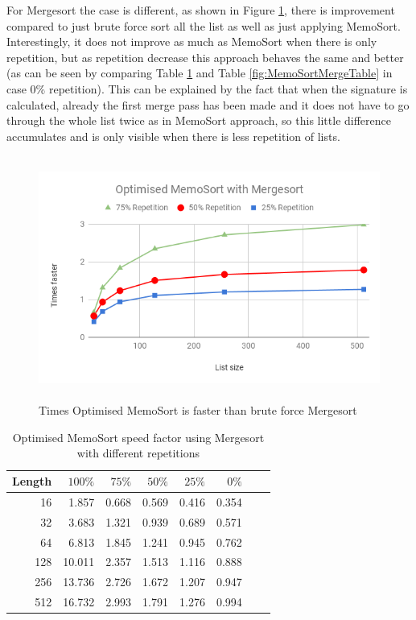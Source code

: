 \documentclass[a4paper,12pt]{article}
\begin{document}
For Mergesort the case is different, as shown in Figure \ref{fig:OptMemoSortMergeGraph}, there is improvement compared to just brute force sort all the list as well as just applying MemoSort. Interestingly, it does not improve as much as MemoSort when there is only repetition, but as repetition decrease this approach behaves the same and better (as can be seen by comparing Table \ref{fig:OptMemoSortMergeTable} and Table \ref{fig:MemoSortMergeTable} in case 0\% repetition). This can be explained by the fact that when the signature is calculated, already the first merge pass has been made and it does not have to go through the whole list twice as in MemoSort approach, so this little difference accumulates and is only visible when there is less repetition of lists.


\begin{figure}[H]
    \centering
    \includegraphics[height=8cm,keepaspectratio]{./images/OptMemoSortMerge.png}
    \caption{Times Optimised MemoSort is faster than brute force Mergesort}
    \label{fig:OptMemoSortMergeGraph}
\end{figure}


\begin{table}[H]
\centering
\begin{tabular}{|r|r|r|r|r|r|r|r|}   \hline
	{Length}  & {$100\%$} & {$75\%$} & {$50\%$} & {$25\%$} & {$0\%$} \\  \hline
	16 &1.857&0.668 & 0.569 &0.416&0.354\\ 
	32 &3.683&1.321 & 0.939&0.689&0.571\\ 
	64 &6.813 &1.845&1.241&0.945&0.762\\ 
	128 &10.011&2.357&1.513&1.116&0.888\\ 
	256 &13.736&2.726&1.672&1.207&0.947\\ 
	512 & 16.732&2.993&1.791&1.276&0.994\\  \hline
\end{tabular}
\caption{Optimised MemoSort speed factor using Mergesort with different repetitions}
\label{fig:OptMemoSortMergeTable}
\end{table}
\end{document}

